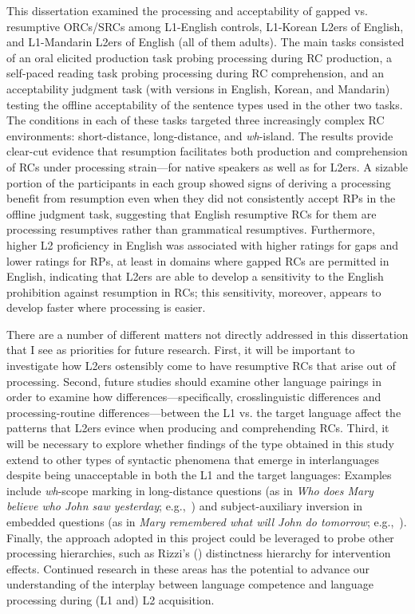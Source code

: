 This dissertation examined the processing and acceptability of gapped vs. resumptive ORCs/SRCs among L1-English controls, L1-Korean L2ers of English, and L1-Mandarin L2ers of English (all of them adults). The main tasks consisted of an oral elicited production task probing processing during RC production, a self-paced reading task probing processing during RC comprehension, and an acceptability judgment task (with versions in English, Korean, and Mandarin) testing the offline acceptability of the sentence types used in the other two tasks. The conditions in each of these tasks targeted three increasingly complex RC environments: short-distance, long-distance, and \textit{wh}-island. The results provide clear-cut evidence that resumption facilitates both production and comprehension of RCs under processing strain---for native speakers as well as for L2ers. A sizable portion of the participants in each group showed signs of deriving a processing benefit from resumption even when they did not consistently accept RPs in the offline judgment task, suggesting that English resumptive RCs for them are processing resumptives rather than grammatical resumptives. Furthermore, higher L2 proficiency in English was associated with higher ratings for gaps and lower ratings for RPs, at least in domains where gapped RCs are permitted in English, indicating that L2ers are able to develop a sensitivity to the English prohibition against resumption in RCs; this sensitivity, moreover, appears to develop faster where processing is easier. 

There are a number of different matters not directly addressed in this dissertation that I see as priorities for future research. First, it will be important to investigate how L2ers ostensibly come to have resumptive RCs that arise out of processing. Second, future studies should examine other language pairings in order to examine how differences---specifically, crosslinguistic differences and processing-routine differences---between the L1 vs. the target language affect the patterns that L2ers evince when producing and comprehending RCs. Third, it will be necessary to explore whether findings of the type obtained in this study extend to other types of syntactic phenomena that emerge in interlanguages despite being unacceptable in both the L1 and the target languages: Examples include \textit{wh}-scope marking in long-distance questions (as in \textit{Who does Mary believe who John saw yesterday}; e.g.,~\cite{schulz2006}) and subject-auxiliary inversion in embedded questions (as in \textit{Mary remembered what will John do tomorrow}; e.g.,~\cite{pozzan.quirk2014}). Finally, the approach adopted in this project could be leveraged to probe other processing hierarchies, such as Rizzi's (\citeyear{rizzi2018}) distinctness hierarchy for intervention effects. Continued research in these areas has the potential to advance our understanding of the interplay between language competence and language processing during (L1 and) L2 acquisition.